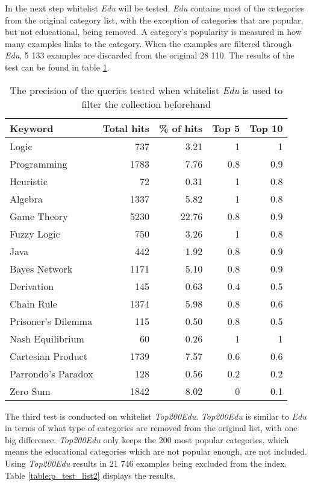 In the next step whitelist \textit{Edu} will be tested. \textit{Edu} contains most of the categories from the original category list, with the exception of categories that are popular, but not educational, being removed. A category's popularity is measured in how many examples links to the category. When the examples are filtered through \textit{Edu}, 5 133 examples are discarded from the original 28 110. The results of the test can be found in table \ref{table:p_test_list1}.

\begin{table}[h]
\centering
\small
\begin{tabular} {|| p{10em} | r | r | r | r ||} 
 \hline
 Keyword & Total hits & \% of hits & Top 5 & Top 10 \\ [0.5ex] 
 \hline

Logic & 737 & 3.21 & 1 & 1 \\
Programming & 1783 & 7.76 & 0.8 & 0.9 \\
Heuristic & 72 & 0.31 & 1 & 0.8 \\
Algebra & 1337 & 5.82 & 1 & 0.8 \\
Game Theory & 5230 & 22.76 & 0.8 & 0.9 \\
\hline
Fuzzy Logic & 750 & 3.26 & 1 & 0.8 \\
Java & 442 & 1.92 & 0.8 & 0.9 \\
Bayes Network & 1171 & 5.10 & 0.8 & 0.9 \\
Derivation & 145 & 0.63 & 0.4 & 0.5 \\
\hline
Chain Rule & 1374 & 5.98 & 0.8 & 0.6 \\
Prisoner's Dilemma & 115 & 0.50 & 0.8 & 0.5 \\
Nash Equilibrium & 60 & 0.26 & 1 & 1 \\
Cartesian Product & 1739 & 7.57 & 0.6 & 0.6 \\
Parrondo's Paradox & 128 & 0.56 & 0.2 & 0.2 \\
Zero Sum & 1842 & 8.02 & 0 & 0.1 \\

 \hline
\end{tabular}
\caption{The precision of the queries tested when whitelist \textit{Edu} is used to filter the collection beforehand}
\label{table:p_test_list1}
\end{table}
\clearpage


The third test is conducted on whitelist \textit{Top200Edu}. \textit{Top200Edu} is similar to \textit{Edu} in terms of what type of categories are removed from the original list, with one big difference. \textit{Top200Edu} only keeps the 200 most popular categories, which means the educational categories which are not popular enough, are not included. Using \textit{Top200Edu} results in 21 746 examples being excluded from the index. Table \ref{table:p_test_list2} displays the results.


